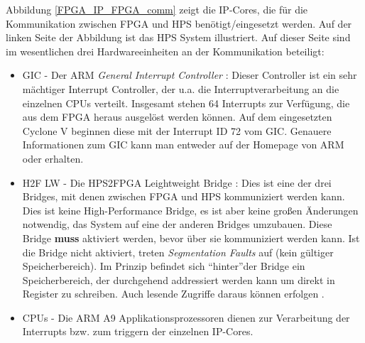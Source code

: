 Abbildung \ref{FPGA_IP_FPGA_comm} zeigt die \ac{IP}-Cores, die für die Kommunikation zwischen \ac{FPGA} und \ac{HPS} benötigt/eingesetzt werden. Auf der linken Seite der Abbildung ist das \ac{HPS} System illustriert. Auf dieser Seite sind im wesentlichen drei Hardwareeinheiten an der Kommunikation beteiligt:
\begin{itemize}
	\item GIC - Der ARM \textit{General Interrupt Controller} : Dieser Controller ist ein sehr mächtiger Interrupt Controller, der u.a. die Interruptverarbeitung an die einzelnen CPUs verteilt. Insgesamt stehen 64 Interrupts zur Verfügung, die aus dem \ac{FPGA} heraus ausgelöst werden können. Auf dem eingesetzten Cyclone V beginnen diese mit der Interrupt ID 72 vom GIC. Genauere Informationen zum GIC kann man entweder auf der Homepage von ARM oder \cite{Using_GIC} erhalten.
	\item H2F LW - Die \ac{HPS}2\ac{FPGA} Leightweight Bridge : Dies ist eine der drei Bridges, mit denen zwischen \ac{FPGA} und \ac{HPS} kommuniziert werden kann. Dies ist keine High-Performance Bridge, es ist aber keine großen Änderungen notwendig, das System auf eine der anderen Bridges umzubauen. Diese Bridge \textbf{muss} aktiviert werden, bevor über sie kommuniziert werden kann. Ist die Bridge nicht aktiviert, treten \textit{Segmentation Faults} auf (kein gültiger Speicherbereich). Im Prinzip befindet sich \textquotedblleft hinter\textquotedblright der Bridge ein Speicherbereich, der durchgehend addressiert werden kann um direkt in Register zu schreiben. Auch lesende Zugriffe daraus können erfolgen \cite{FPGA_Workshop}.
	\item CPUs - Die ARM A9 Applikationsprozessoren dienen zur Verarbeitung der Interrupts bzw. zum triggern der einzelnen IP-Cores.
\end{itemize}

